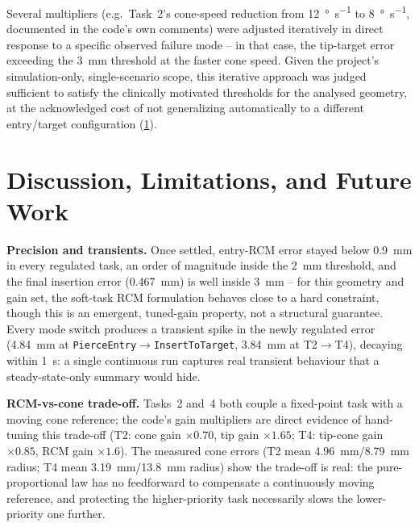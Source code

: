 \documentclass[11pt,a4paper]{article}
\newcommand{\code}[1]{\texttt{#1}}
\begin{document}
\begin{description}[leftmargin=0pt,style=nextline]
\item[\textbf{Manually tuned, mode-specific gain multipliers instead of a single global gain set or a systematic optimization.}] Several multipliers (e.g.\ Task~2's cone-speed reduction from \SI{12}{\degree\per\second} to \SI{8}{\degree\per\second}, documented in the code's own comments) were adjusted iteratively in direct response to a specific observed failure mode -- in that case, the tip-target error exceeding the \SI{3}{\milli\meter} threshold at the faster cone speed. Given the project's simulation-only, single-scenario scope, this iterative approach was judged sufficient to satisfy the clinically motivated thresholds for the analysed geometry, at the acknowledged cost of not generalizing automatically to a different entry/target configuration (\cref{sec:discussion}).
\end{description}

\section{Discussion, Limitations, and Future Work}
\label{sec:discussion}

\textbf{Precision and transients.} Once settled, entry-RCM error stayed below \SI{0.9}{\milli\meter} in every regulated task, an order of magnitude inside the \SI{2}{\milli\meter} threshold, and the final insertion error (\SI{0.467}{\milli\meter}) is well inside \SI{3}{\milli\meter} -- for this geometry and gain set, the soft-task RCM formulation behaves close to a hard constraint, though this is an emergent, tuned-gain property, not a structural guarantee. Every mode switch produces a transient spike in the newly regulated error (\SI{4.84}{\milli\meter} at \code{PierceEntry}$\to$\code{InsertToTarget}, \SI{3.84}{\milli\meter} at T2$\to$T4), decaying within \SI{1}{\second}: a single continuous run captures real transient behaviour that a steady-state-only summary would hide.

\textbf{RCM-vs-cone trade-off.} Tasks~2 and~4 both couple a fixed-point task with a moving cone reference; the code's gain multipliers are direct evidence of hand-tuning this trade-off (T2: cone gain $\times0.70$, tip gain $\times1.65$; T4: tip-cone gain $\times0.85$, RCM gain $\times1.6$). The measured cone errors (T2 mean \SI{4.96}{\milli\meter}/\SI{8.79}{\milli\meter} radius; T4 mean \SI{3.19}{\milli\meter}/\SI{13.8}{\milli\meter} radius) show the trade-off is real: the pure-proportional law has no feedforward to compensate a continuously moving reference, and protecting the higher-priority task necessarily slows the lower-priority one further.
\end{document}
